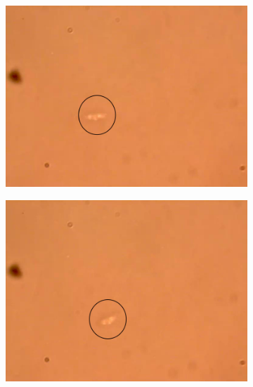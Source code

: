 \documentclass[10pt,aspectratio=1610,compress,dvipsnames]{beamer}
\begin{document}
\begin{frame}
{\begin{figure}[H]
     \centering
     \begin{subfigure}[b]{0.3\textwidth}
         \centering
         \includegraphics[width=\textwidth]{Results/Resultsforthalgae/falgae1_image2327.png}
         \caption{}
         \label{fig:y equals x}
     \end{subfigure}
     \hfill
     \begin{subfigure}[b]{0.3\textwidth}
         \centering
         \includegraphics[width=\textwidth]{Results/Resultsforthalgae/falgae2.png}
         \caption{}
         \label{fig:three sin x}
     \end{subfigure}
     \hfill
     \begin{subfigure}[b]{0.3\textwidth}

\end{subfigure}
\end{figure}}
\end{frame}
\end{document}
